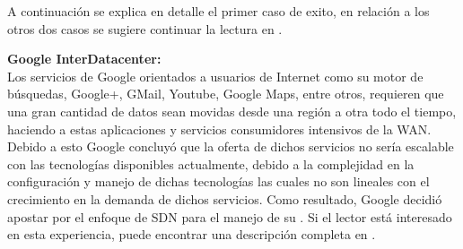 A continuaci\'on se explica en detalle el primer caso de exito, en relaci\'on a los otros dos casos se sugiere continuar la lectura en \cite{ONFSuccessCase}.

\textbf{Google InterDatacenter:}\\

Los servicios de Google orientados a usuarios de Internet como su motor de búsquedas, Google+, GMail, Youtube, Google Maps, entre otros, requieren que una gran cantidad de datos sean movidas desde una región a otra todo el tiempo, haciendo a estas aplicaciones y servicios consumidores intensivos de la WAN. Debido a esto Google concluy\'o que la oferta de dichos servicios no sería escalable con las tecnologías disponibles actualmente, debido a la complejidad en la configuración y manejo de dichas tecnologías las cuales no son lineales con el crecimiento en la demanda de dichos servicios. Como resultado, Google decidió apostar por el enfoque de SDN para el manejo de su . Si el lector est\'a interesado en esta experiencia, puede encontrar una descripción completa en \cite{jain2013b4}.


 


